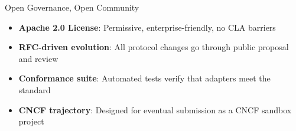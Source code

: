 \begin{frame}{Open Governance, Open Community}
  \vspace{0.2cm}

  \begin{itemize}
    \item \textbf{Apache 2.0 License}: Permissive, enterprise-friendly, no CLA barriers
    \item \textbf{RFC-driven evolution}: All protocol changes go through public proposal and review
    \item \textbf{Conformance suite}: Automated tests verify that adapters meet the standard
    \item \textbf{CNCF trajectory}: Designed for eventual submission as a CNCF sandbox project
  \end{itemize}
\end{frame}
